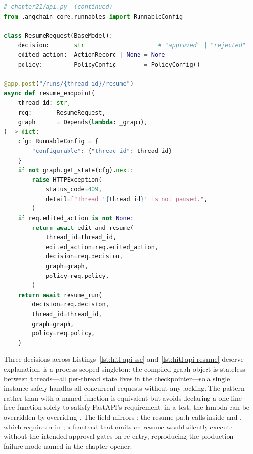 \begin{lstlisting}[language=Python,
  caption={Resume endpoint: pause-state guard and decision injection},
  label={lst:hitl-api-resume}]
# chapter21/api.py  (continued)
from langchain_core.runnables import RunnableConfig

class ResumeRequest(BaseModel):
    decision:       str                     # "approved" | "rejected"
    edited_action:  ActionRecord | None = None
    policy:         PolicyConfig        = PolicyConfig()

@app.post("/runs/{thread_id}/resume")
async def resume_endpoint(
    thread_id: str,
    req:       ResumeRequest,
    graph      = Depends(lambda: _graph),
) -> dict:
    cfg: RunnableConfig = {
        "configurable": {"thread_id": thread_id}
    }
    if not graph.get_state(cfg).next:
        raise HTTPException(
            status_code=409,
            detail=f"Thread '{thread_id}' is not paused.",
        )
    if req.edited_action is not None:
        return await edit_and_resume(
            thread_id=thread_id,
            edited_action=req.edited_action,
            decision=req.decision,
            graph=graph,
            policy=req.policy,
        )
    return await resume_run(
        decision=req.decision,
        thread_id=thread_id,
        graph=graph,
        policy=req.policy,
    )
\end{lstlisting}

Three decisions across Listings~\ref{lst:hitl-api-sse}
and~\ref{lst:hitl-api-resume} deserve explanation.
 is a process-scoped singleton: the compiled graph object is
stateless between threads---all per-thread state lives in the
 checkpointer---so a single instance safely handles all
concurrent requests without any locking. The 
pattern rather than  with a named function is
equivalent but avoids declaring a one-line free function solely to satisfy
FastAPI's  requirement; in a test, the lambda can be overridden
by overriding . The
 field mirrors : the
resume path calls  inside
 and , which requires a
 in ; a frontend that omits
 on resume would silently execute without the intended approval
gates on re-entry, reproducing the production failure mode named in the
chapter opener.

